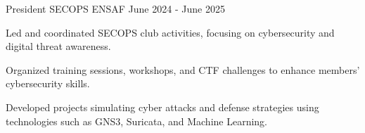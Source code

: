 
\begin{cventries}

    \cventry
    {President} %
    {SECOPS} %
    {ENSAF} %
    {June 2024 - June 2025} %
    {
        \begin{cvitems} %
            \item {Led and coordinated SECOPS club activities, focusing on cybersecurity and digital threat awareness.}
            \item {Organized training sessions, workshops, and CTF challenges to enhance members' cybersecurity skills.}
            \item {Developed projects simulating cyber attacks and defense strategies using technologies such as GNS3, Suricata, and Machine Learning.}
        \end{cvitems}
    }

\end{cventries}
